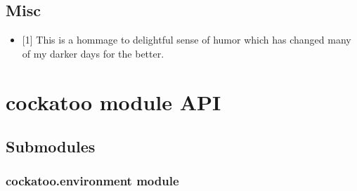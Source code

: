 \documentclass[letterpaper,10pt,english]{sphinxmanual}
\begin{document}
\section{Misc}
\label{\detokenize{README:misc}}\begin{itemize}
\item {} 
{[}1{]} This is a hommage to  delightful
sense of humor which has changed many of my darker days for the
better.

\end{itemize}
\label{\detokenize{cockatoo:module-cockatoo}}

\chapter{cockatoo module API}
\label{\detokenize{cockatoo:cockatoo-module-api}}\label{\detokenize{cockatoo::doc}}

\section{Submodules}
\label{\detokenize{cockatoo:submodules}}

\subsection{cockatoo.environment module}
\label{\detokenize{cockatoo:module-cockatoo.environment}}\label{\detokenize{cockatoo:cockatoo-environment-module}}
\end{document}
